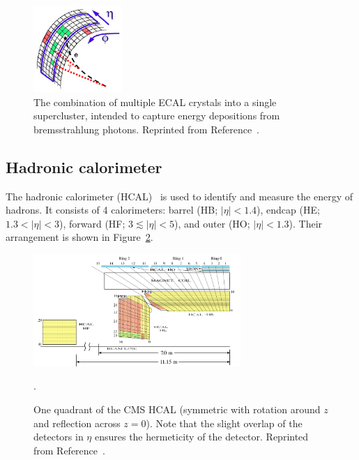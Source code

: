 \begin{figure}[]
    \begin{center} 
        \includegraphics[width=0.3\textwidth]{figures/cms/sc.png}
        \caption{The combination of multiple ECAL crystals into a single supercluster, intended to capture energy depositions from bremsstrahlung photons.
                  Reprinted from Reference~\cite{cmsecalrev}.}
        \label{fig:cms:sc}
    \end{center}
\end{figure}

\subsection{Hadronic calorimeter}

The hadronic calorimeter (HCAL)~\cite{cmshcaltdr,cmspf,cmshcalperf} is used to identify and measure the energy of hadrons.
It consists of 4 calorimeters: barrel (HB; $|\eta|<1.4$), endcap (HE; $1.3<|\eta|<3$), forward (HF; $3\lesssim|\eta|<5$), and outer (HO; $|\eta|<1.3$).
Their arrangement is shown in Figure~\ref{fig:cms:hcal}.

\begin{figure}[]
\begin{center}
	\includegraphics[width=0.7\textwidth]{figures/cms/hcal.png}
	\caption{One quadrant of the CMS HCAL (symmetric with rotation around $z$ and reflection across $z=0$).
			 Note that the slight overlap of the detectors in $\eta$ ensures the hermeticity of the detector.
			 Reprinted from Reference~\cite{cmshcalperf}.}
	\label{fig:cms:hcal}.
\end{center}
\end{figure}

